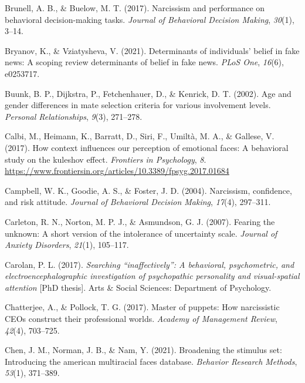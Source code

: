 \documentclass[
  man,mask,floatsintext]{apa6}
\newlength{\cslhangindent}
\newlength{\cslentryspacingunit} %
\newenvironment{CSLReferences}[2] %
 {%
  \setlength{\parindent}{0pt}
  \ifodd #1
  \let\oldpar\par
  \def\par{\hangindent=\cslhangindent\oldpar}
  \fi
  \setlength{\parskip}{#2\cslentryspacingunit}
 }%
 {}
\begin{document}
\begin{CSLReferences}{1}{0}
\leavevmode{}%
Brunell, A. B., \& Buelow, M. T. (2017). Narcissism and performance on behavioral decision-making tasks. \emph{Journal of Behavioral Decision Making}, \emph{30}(1), 3--14.

\leavevmode{}%
Bryanov, K., \& Vziatysheva, V. (2021). Determinants of individuals' belief in fake news: A scoping review determinants of belief in fake news. \emph{PLoS One}, \emph{16}(6), e0253717.

\leavevmode{}%
Buunk, B. P., Dijkstra, P., Fetchenhauer, D., \& Kenrick, D. T. (2002). Age and gender differences in mate selection criteria for various involvement levels. \emph{Personal Relationships}, \emph{9}(3), 271--278.

\leavevmode{}%
Calbi, M., Heimann, K., Barratt, D., Siri, F., Umiltà, M. A., \& Gallese, V. (2017). How context influences our perception of emotional faces: A behavioral study on the kuleshov effect. \emph{Frontiers in Psychology}, \emph{8}. \url{https://www.frontiersin.org/articles/10.3389/fpsyg.2017.01684}

\leavevmode{}%
Campbell, W. K., Goodie, A. S., \& Foster, J. D. (2004). Narcissism, confidence, and risk attitude. \emph{Journal of Behavioral Decision Making}, \emph{17}(4), 297--311.

\leavevmode{}%
Carleton, R. N., Norton, M. P. J., \& Asmundson, G. J. (2007). Fearing the unknown: A short version of the intolerance of uncertainty scale. \emph{Journal of Anxiety Disorders}, \emph{21}(1), 105--117.

\leavevmode{}%
Carolan, P. L. (2017). \emph{Searching {``inaffectively''}: A behavioral, psychometric, and electroencephalographic investigation of psychopathic personality and visual-spatial attention} {[}PhD thesis{]}. Arts \& Social Sciences: Department of Psychology.

\leavevmode{}%
Chatterjee, A., \& Pollock, T. G. (2017). Master of puppets: How narcissistic CEOs construct their professional worlds. \emph{Academy of Management Review}, \emph{42}(4), 703--725.

\leavevmode{}%
Chen, J. M., Norman, J. B., \& Nam, Y. (2021). Broadening the stimulus set: Introducing the american multiracial faces database. \emph{Behavior Research Methods}, \emph{53}(1), 371--389.


\end{CSLReferences}
\end{document}
